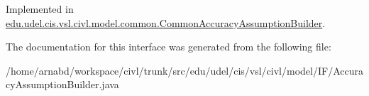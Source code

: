Implemented in \hyperlink{classedu_1_1udel_1_1cis_1_1vsl_1_1civl_1_1model_1_1common_1_1CommonAccuracyAssumptionBuilder_a53a4952027da7effe41c5d152ae81fa8}{edu.\+udel.\+cis.\+vsl.\+civl.\+model.\+common.\+Common\+Accuracy\+Assumption\+Builder}.



The documentation for this interface was generated from the following file\+:\begin{DoxyCompactItemize}
\item 
/home/arnabd/workspace/civl/trunk/src/edu/udel/cis/vsl/civl/model/\+I\+F/Accuracy\+Assumption\+Builder.\+java\end{DoxyCompactItemize}
